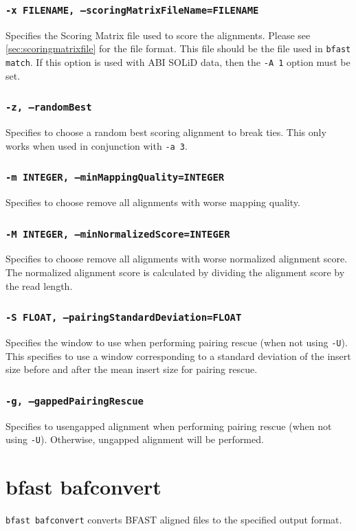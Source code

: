 \documentclass[a4paper,12pt]{book}
\newcommand{\TT}[1]{{\tt #1}} %
\newcommand{\BAF}{BFAST aligned file} %
\begin{document}
\subsubsection{\TT{-x FILENAME, --scoringMatrixFileName=FILENAME}}
Specifies the Scoring Matrix file used to score the alignments.
Please see \autoref{sec:scoringmatrixfile} for the file format.
This file should be the file used in \TT{bfast match}.
If this option is used with ABI SOLiD data, then the \TT{-A 1} option must be set.

\subsubsection{\tt{-z, --randomBest}}
Specifies to choose a random best scoring alignment to break ties.
This only works when used in conjunction with \TT{-a 3}.

\subsubsection{\tt{-m INTEGER, --minMappingQuality=INTEGER}}
Specifies to choose remove all alignments with worse mapping quality.

\subsubsection{\tt{-M INTEGER, --minNormalizedScore=INTEGER}}
Specifies to choose remove all alignments with worse normalized alignment score.
The normalized alignment score is calculated by dividing the alignment score by the read length.
\subsubsection{\tt{-S FLOAT, --pairingStandardDeviation=FLOAT}}
Specifies the window to use when performing pairing rescue (when not using \TT{-U}).
This specifies to use a window corresponding to a standard deviation of the insert size before and after the mean insert size for pairing rescue.
\subsubsection{\tt{-g, --gappedPairingRescue}}
Specifies to usengapped alignment when performing pairing rescue (when not using \TT{-U}).
Otherwise, ungapped alignment will be performed.

\section{bfast bafconvert}
\label{sec:bafconvert}
\TT{bfast bafconvert} converts \BAF{s} to the specified output format.
\end{document}
